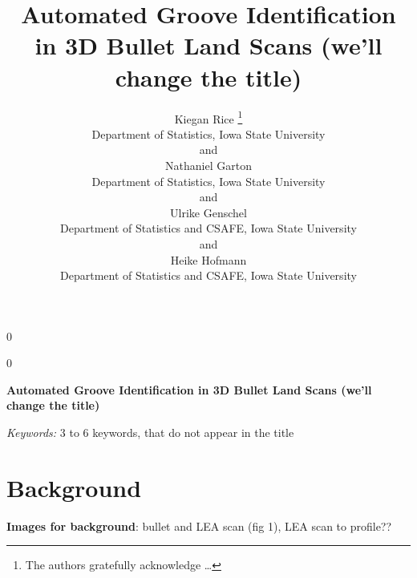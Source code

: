 \documentclass[12pt]{article}
\newcommand{\blind}{0}
\begin{document}
\def\spacingset#1{\renewcommand{\baselinestretch}%
{#1}\small\normalsize} \spacingset{1}




\blind
{
  \title{\bf Automated Groove Identification in 3D Bullet Land Scans (we'll change
the title)}

  \author{
        Kiegan Rice \thanks{The authors gratefully acknowledge \ldots{}} \\
    Department of Statistics, Iowa State University\\
     and \\     Nathaniel Garton \\
    Department of Statistics, Iowa State University\\
     and \\     Ulrike Genschel \\
    Department of Statistics and CSAFE, Iowa State University\\
     and \\     Heike Hofmann \\
    Department of Statistics and CSAFE, Iowa State University\\
      }
  \maketitle
} \fi

\blind
{
  \bigskip
  \bigskip
  \bigskip
  \begin{center}
    {\LARGE\bf Automated Groove Identification in 3D Bullet Land Scans (we'll change
the title)}
  \end{center}
  \medskip
} \fi

\bigskip
\begin{abstract}

\end{abstract}

\noindent%
{\it Keywords:} 3 to 6 keywords, that do not appear in the title
\vfill

\newpage
\spacingset{1.45} %

\section{Background}

\textbf{Images for background}: bullet and LEA scan (fig 1), LEA scan to
profile??
\end{document}
